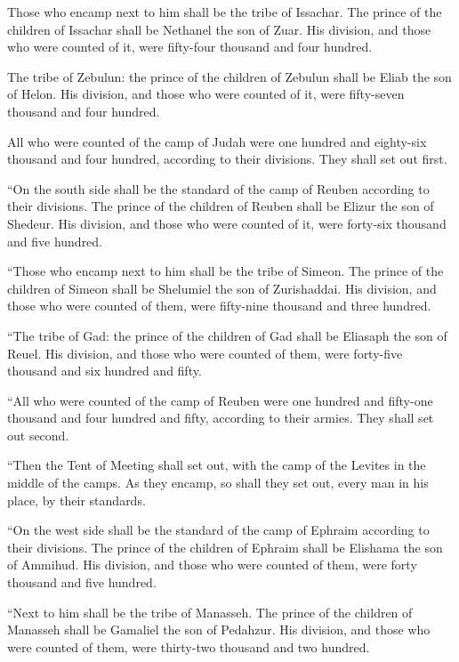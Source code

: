  Those who encamp next to him shall be the tribe of
Issachar. The prince of the children of Issachar shall be Nethanel the
son of Zuar.  His division, and those who were counted of
it, were fifty-four thousand and four hundred.

 The tribe of Zebulun: the prince of the children of
Zebulun shall be Eliab the son of Helon.  His division,
and those who were counted of it, were fifty-seven thousand and four
hundred.

 All who were counted of the camp of Judah were one
hundred and eighty-six thousand and four hundred, according to their
divisions. They shall set out first.

 ``On the south side shall be the standard of the camp of
Reuben according to their divisions. The prince of the children of
Reuben shall be Elizur the son of Shedeur.  His division,
and those who were counted of it, were forty-six thousand and five
hundred.

 ``Those who encamp next to him shall be the tribe of
Simeon. The prince of the children of Simeon shall be Shelumiel the son
of Zurishaddai.  His division, and those who were counted
of them, were fifty-nine thousand and three hundred.

 ``The tribe of Gad: the prince of the children of Gad
shall be Eliasaph the son of Reuel.  His division, and
those who were counted of them, were forty-five thousand and six hundred
and fifty.

 ``All who were counted of the camp of Reuben were one
hundred and fifty-one thousand and four hundred and fifty, according to
their armies. They shall set out second.

 ``Then the Tent of Meeting shall set out, with the camp
of the Levites in the middle of the camps. As they encamp, so shall they
set out, every man in his place, by their standards.

 ``On the west side shall be the standard of the camp of
Ephraim according to their divisions. The prince of the children of
Ephraim shall be Elishama the son of Ammihud.  His
division, and those who were counted of them, were forty thousand and
five hundred.

 ``Next to him shall be the tribe of Manasseh. The prince
of the children of Manasseh shall be Gamaliel the son of Pedahzur.
 His division, and those who were counted of them, were
thirty-two thousand and two hundred.

